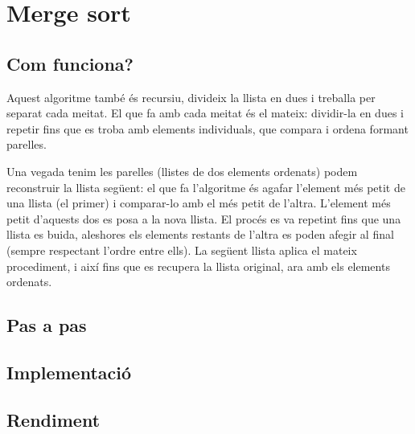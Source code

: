\chapter{Merge sort}

\section{Com funciona?}
Aquest algoritme també és recursiu, divideix la llista en dues i treballa per separat cada meitat. El que fa amb cada meitat és el mateix: dividir-la en dues i repetir fins que es troba amb elements individuals, que compara i ordena formant parelles.

Una vegada tenim les parelles (llistes de dos elements ordenats) podem reconstruir la llista següent: el que fa l'algoritme és agafar l'element més petit de una llista (el primer) i comparar-lo amb el més petit de l'altra. L'element més petit d'aquests dos es posa a la nova llista. El procés es va repetint fins que una llista es buida, aleshores els elements restants de l'altra es poden afegir al final (sempre respectant l'ordre entre ells).
La següent llista aplica el mateix procediment, i així fins que es recupera la llista original, ara amb els elements ordenats.

\section{Pas a pas}

\section{Implementació}


\begin{minipage}{\textwidth}
	\section{Rendiment}
	\noindent
	\makebox[\textwidth][c]{
		
	}
	\vspace*{1em}
	\begin{center}
		
	\end{center}
\end{minipage}